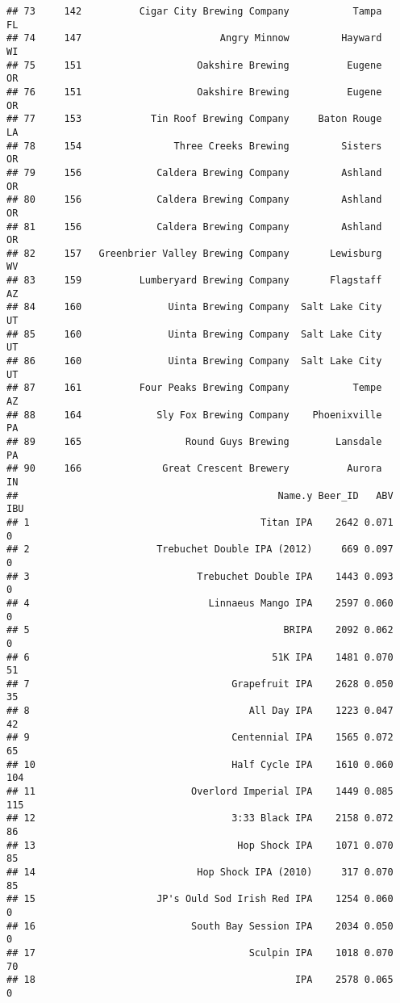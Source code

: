 \documentclass[
]{article}
\begin{document}
\begin{verbatim}
## 73     142          Cigar City Brewing Company           Tampa    FL
## 74     147                        Angry Minnow         Hayward    WI
## 75     151                    Oakshire Brewing          Eugene    OR
## 76     151                    Oakshire Brewing          Eugene    OR
## 77     153            Tin Roof Brewing Company     Baton Rouge    LA
## 78     154                Three Creeks Brewing         Sisters    OR
## 79     156             Caldera Brewing Company         Ashland    OR
## 80     156             Caldera Brewing Company         Ashland    OR
## 81     156             Caldera Brewing Company         Ashland    OR
## 82     157   Greenbrier Valley Brewing Company       Lewisburg    WV
## 83     159          Lumberyard Brewing Company       Flagstaff    AZ
## 84     160               Uinta Brewing Company  Salt Lake City    UT
## 85     160               Uinta Brewing Company  Salt Lake City    UT
## 86     160               Uinta Brewing Company  Salt Lake City    UT
## 87     161          Four Peaks Brewing Company           Tempe    AZ
## 88     164             Sly Fox Brewing Company    Phoenixville    PA
## 89     165                  Round Guys Brewing        Lansdale    PA
## 90     166              Great Crescent Brewery          Aurora    IN
##                                             Name.y Beer_ID   ABV IBU
## 1                                        Titan IPA    2642 0.071   0
## 2                      Trebuchet Double IPA (2012)     669 0.097   0
## 3                             Trebuchet Double IPA    1443 0.093   0
## 4                               Linnaeus Mango IPA    2597 0.060   0
## 5                                            BRIPA    2092 0.062   0
## 6                                          51K IPA    1481 0.070  51
## 7                                   Grapefruit IPA    2628 0.050  35
## 8                                      All Day IPA    1223 0.047  42
## 9                                   Centennial IPA    1565 0.072  65
## 10                                  Half Cycle IPA    1610 0.060 104
## 11                           Overlord Imperial IPA    1449 0.085 115
## 12                                  3:33 Black IPA    2158 0.072  86
## 13                                   Hop Shock IPA    1071 0.070  85
## 14                            Hop Shock IPA (2010)     317 0.070  85
## 15                     JP's Ould Sod Irish Red IPA    1254 0.060   0
## 16                           South Bay Session IPA    2034 0.050   0
## 17                                     Sculpin IPA    1018 0.070  70
## 18                                             IPA    2578 0.065   0

\end{verbatim}
\end{document}
